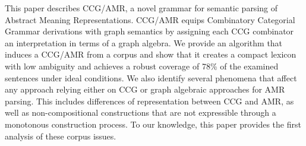 This paper describes CCG/AMR, a novel grammar for semantic parsing of Abstract Meaning Representations. CCG/AMR equips Combinatory Categorial Grammar derivations with graph semantics by assigning each CCG combinator an interpretation in terms of a graph algebra. We provide an algorithm that induces a CCG/AMR from a corpus and show that it creates a compact lexicon with low ambiguity and achieves a robust coverage of 78\% of the examined sentences under ideal conditions. We also identify several phenomena that affect any approach relying either on CCG or graph algebraic approaches for AMR parsing. This includes differences of representation between CCG and AMR, as well as non-compositional constructions that are not expressible through a monotonous construction process. To our knowledge, this paper provides the first analysis of these corpus issues.

